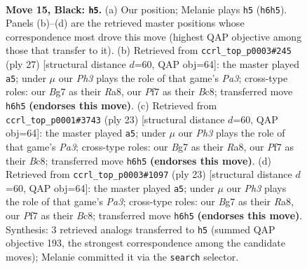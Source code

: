 \documentclass[11pt]{article}
\begin{document}
\clearpage

\begin{figure}[p]\centering
\begin{subfigure}{0.46\textwidth}\centering
\resizebox{\linewidth}{!}{%
\newchessgame
\chessboard[
  setfen={rnbqr1k1/pp3pb1/4pnpp/3p4/P2P4/1B3NPP/RPP1QP2/1NB1R1K1 b - - 0 15},
  showmover=false,
  pgfstyle=straightmove, color=movearrow, markmove={h6-h5}
]}
\caption{}
\end{subfigure}\hfill
\begin{subfigure}{0.46\textwidth}\centering
\resizebox{\linewidth}{!}{%
\newchessgame
\chessboard[
  setfen={r1b2rk1/2q1bppp/p1pppn2/8/4PP2/2N1B1Q1/PPP1B1PP/R4RK1 b - - 3 14},
  showmover=false,
  pgfstyle=straightmove, color=movearrow, markmove={a6-a5}
]}
\caption{}
\end{subfigure}
\\[4pt]
\begin{subfigure}{0.46\textwidth}\centering
\resizebox{\linewidth}{!}{%
\newchessgame
\chessboard[
  setfen={r1b2rk1/2q1bppp/p1pppn2/8/4PP2/2N1B1Q1/PPP1B1PP/R4RK1 b - - 3 12},
  showmover=false,
  pgfstyle=straightmove, color=movearrow, markmove={a6-a5}
]}
\caption{}
\end{subfigure}\hfill
\begin{subfigure}{0.46\textwidth}\centering
\resizebox{\linewidth}{!}{%
\newchessgame
\chessboard[
  setfen={r1b2rk1/2q1bppp/p1pppn2/8/4PP2/2N1B1Q1/PPP1B1PP/R4RK1 b - - 3 12},
  showmover=false,
  pgfstyle=straightmove, color=movearrow, markmove={a6-a5}
]}
\caption{}
\end{subfigure}
\caption{\textbf{Move 15, Black: \texttt{h5}.} (a) Our position; Melanie plays \texttt{h5} (\texttt{h6h5}). Panels (b)--(d) are the retrieved master positions whose correspondence most drove this move (highest QAP objective among those that transfer to it). (b) Retrieved from \texttt{ccrl\_top\_p0003\#245} (ply 27) [structural distance $d$=60, QAP obj=64]: the master played \texttt{a5}; under $\mu$ our \emph{Ph3} plays the role of that game's \emph{Pa3}; cross-type roles: our \emph{B}g7 as their \emph{R}a8, our \emph{P}f7 as their \emph{B}c8; transferred move \texttt{h6h5} \textbf{(endorses this move)}. (c) Retrieved from \texttt{ccrl\_top\_p0001\#3743} (ply 23) [structural distance $d$=60, QAP obj=64]: the master played \texttt{a5}; under $\mu$ our \emph{Ph3} plays the role of that game's \emph{Pa3}; cross-type roles: our \emph{B}g7 as their \emph{R}a8, our \emph{P}f7 as their \emph{B}c8; transferred move \texttt{h6h5} \textbf{(endorses this move)}. (d) Retrieved from \texttt{ccrl\_top\_p0003\#1097} (ply 23) [structural distance $d$=60, QAP obj=64]: the master played \texttt{a5}; under $\mu$ our \emph{Ph3} plays the role of that game's \emph{Pa3}; cross-type roles: our \emph{B}g7 as their \emph{R}a8, our \emph{P}f7 as their \emph{B}c8; transferred move \texttt{h6h5} \textbf{(endorses this move)}. Synthesis: 3 retrieved analogs transferred to \texttt{h5} (summed QAP objective 193, the strongest correspondence among the candidate moves); Melanie committed it via the \texttt{search} selector.}
\label{fig:thought-m29}
\end{figure}
\end{document}
